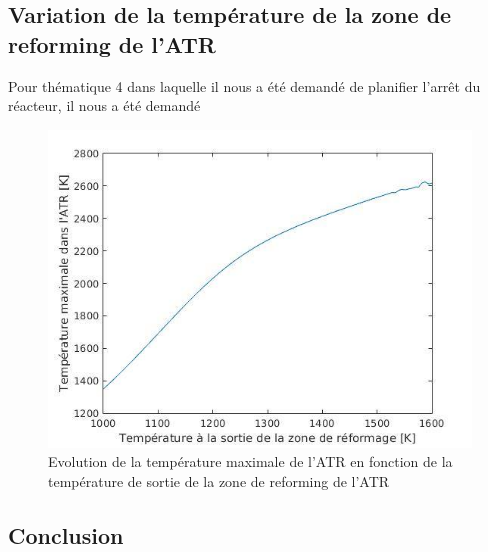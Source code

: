 \documentclass[12pt]{report}
\begin{document}
\section{Variation de la température de la zone de reforming de l'ATR}

Pour thématique 4 dans laquelle il nous a été demandé de planifier l'arrêt du réacteur, il nous a été demandé 

\begin{figure}[H]
\begin{center}
\includegraphics[scale=0.6]{Tmax_Tsortie}
\caption{Evolution de la température maximale de l'ATR en fonction de la température de sortie de la zone de reforming de l'ATR}
\end{center}
\end{figure}

{\textcolor{carmine}{\chapter{Conclusion}}}
\end{document}
